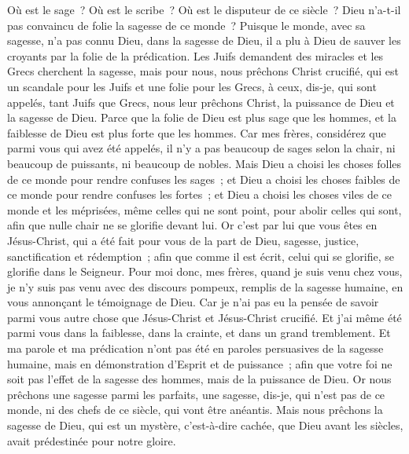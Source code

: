 \begin{multicols}{2}
Où est le sage~? Où est le scribe~? Où est le disputeur de ce siècle~? Dieu n'a-t-il pas convaincu de folie la sagesse de ce monde~?
Puisque le monde, avec sa sagesse, n'a pas connu Dieu, dans la sagesse de Dieu, il a plu à Dieu de sauver les croyants par la folie de la prédication.
Les Juifs demandent des miracles et les Grecs cherchent la sagesse,
mais pour nous, nous prêchons Christ crucifié, qui est un scandale pour les Juifs et une folie pour les Grecs,
à ceux, dis-je, qui sont appelés, tant Juifs que Grecs, nous leur prêchons Christ, la puissance de Dieu et la sagesse de Dieu.
Parce que la folie de Dieu est plus sage que les hommes, et la faiblesse de Dieu est plus forte que les hommes.
Car mes frères, considérez que parmi vous qui avez été appelés, il n'y a pas beaucoup de sages selon la chair, ni beaucoup de puissants, ni beaucoup de nobles.
Mais Dieu a choisi les choses folles de ce monde pour rendre confuses les sages~; et Dieu a choisi les choses faibles de ce monde pour rendre confuses les fortes~;
et Dieu a choisi les choses viles de ce monde et les méprisées, même celles qui ne sont point, pour abolir celles qui sont,
afin que nulle chair ne se glorifie devant lui.
Or c'est par lui que vous êtes en Jésus-Christ, qui a été fait pour vous de la part de Dieu, sagesse, justice, sanctification et rédemption~; 
afin que comme il est écrit, celui qui se glorifie, se glorifie dans le Seigneur.
\VerseOne{}Pour moi donc, mes frères, quand je suis venu chez vous, je n'y suis pas venu avec des discours pompeux, remplis de la sagesse humaine, en vous annonçant le témoignage de Dieu.
Car je n'ai pas eu la pensée de savoir parmi vous autre chose que Jésus-Christ et Jésus-Christ crucifié.
Et j'ai même été parmi vous dans la faiblesse, dans la crainte, et dans un grand tremblement.
Et ma parole et ma prédication n'ont pas été en paroles persuasives de la sagesse humaine, mais en démonstration d'Esprit et de puissance~;
afin que votre foi ne soit pas l'effet de la sagesse des hommes, mais de la puissance de Dieu.
Or nous prêchons une sagesse parmi les parfaits, une sagesse, dis-je, qui n'est pas de ce monde, ni des chefs de ce siècle, qui vont être anéantis.
Mais nous prêchons la sagesse de Dieu, qui est un mystère, c'est-à-dire cachée, que Dieu avant les siècles, avait prédestinée pour notre gloire.

\end{multicols}

